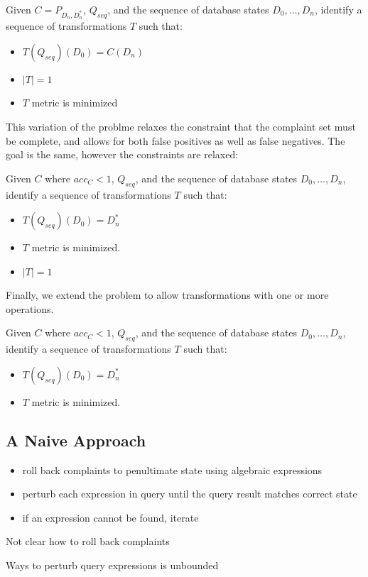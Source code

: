 \begin{problem}\label{prob:complete}
Given $C = P_{D_n, D^*_n}$, $Q_{seq}$, and the sequence of database states $D_0,\ldots,D_n$, 
identify a sequence of transformations $T$ such that:
\begin{itemize}
\item $T(Q_{seq})(D_0) = C(D_n)$
\item $|T| = 1$
\item $T$ metric is minimized
\end{itemize}
\end{problem}

This variation of the problme relaxes the constraint that the complaint set must be complete, and allows
for both false positives as well as false negatives.  The goal is the same, however the constraints are relaxed:

\begin{problem}\label{prob:incomplete}
Given $C$ where $acc_C < 1$, $Q_{seq}$, and the sequence of database states $D_0,\ldots,D_n$, 
identify a sequence of transformations $T$ such that:
\begin{itemize}
\item $T(Q_{seq})(D_0) = D^*_n$
\item $T$ metric is minimized.
\item $|T| = 1$
\end{itemize}
\end{problem}

Finally, we extend the problem to allow transformations with one or more operations.

\begin{problem}\label{prob:multi}
Given $C$ where $acc_C < 1$, $Q_{seq}$, and the sequence of database states $D_0,\ldots,D_n$, 
identify a sequence of transformations $T$ such that:
\begin{itemize}
\item $T(Q_{seq})(D_0) = D^*_n$
\item $T$ metric is minimized.
\end{itemize}
\end{problem}




\subsection{A Naive Approach}

\begin{itemize}
\item roll back complaints to penultimate state using algebraic expressions 
\item perturb each expression in query until the query result matches correct state
\item if an expression cannot be found, iterate
\end{itemize}


Not clear how to roll back complaints

Ways to perturb query expressions is unbounded

